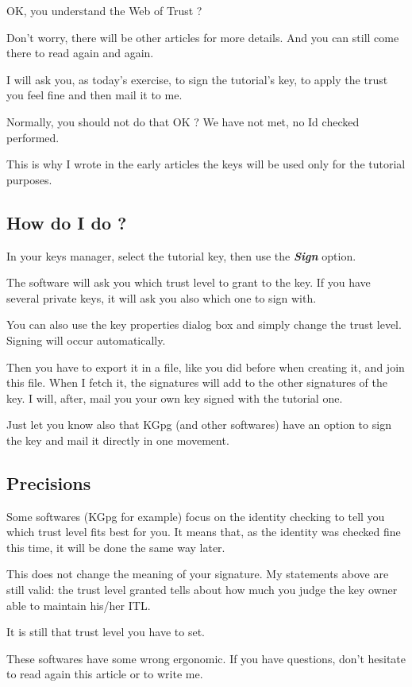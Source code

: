OK, you understand the Web of Trust ?

Don't worry, there will be other articles for more details. And you can
still come there to read again and again.

I will ask you, as today's exercise, to sign the tutorial's key, to
apply the trust you feel fine and then mail it to me.

Normally, you should not do that OK ? We have not met, no Id checked
performed.

This is why I wrote in the early articles the keys will be used only for
the tutorial purposes.

\subsection{How do I do ?}\label{how-do-i-do}

In your keys manager, select the tutorial key, then use the
\textbf{\emph{Sign}} option.

The software will ask you which trust level to grant to the key. If you
have several private keys, it will ask you also which one to sign with.

You can also use the key properties dialog box and simply change the
trust level. Signing will occur automatically.

Then you have to export it in a file, like you did before when creating
it, and join this file. When I fetch it, the signatures will add to the
other signatures of the key. I will, after, mail you your own key signed
with the tutorial one.

Just let you know also that KGpg (and other softwares) have an option to
sign the key and mail it directly in one movement.

\subsection{Precisions}\label{precisions}

Some softwares (KGpg for example) focus on the identity checking to tell
you which trust level fits best for you. It means that, as the identity
was checked fine this time, it will be done the same way later.

This does not change the meaning of your signature. My statements above
are still valid: the trust level granted tells about how much you judge
the key owner able to maintain his/her ITL.

It is still that trust level you have to set.

These softwares have some wrong ergonomic. If you have questions, don't
hesitate to read again this article or to write me.